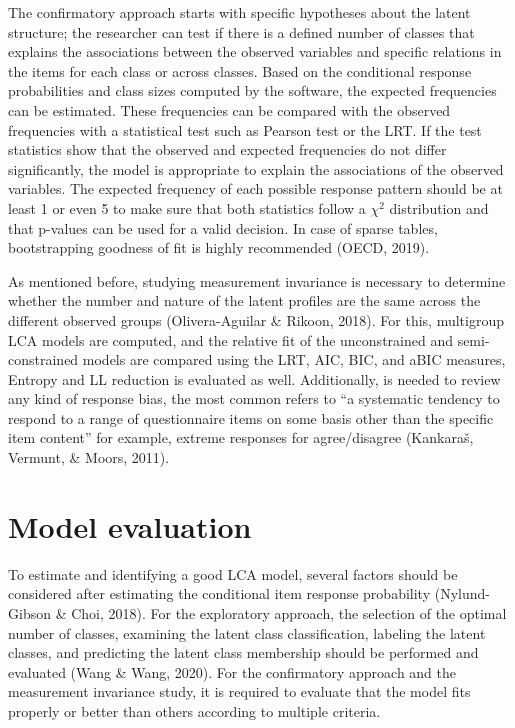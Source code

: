 \documentclass[12pt,a4paper,oneside]{reedthesis}
\begin{document}
The confirmatory approach starts with specific hypotheses about the latent structure; the researcher can test if there is a defined number of classes that explains the associations between the observed variables and specific relations in the items for each class or across classes. Based on the conditional response probabilities and class sizes computed by the software, the expected frequencies can be estimated. These frequencies can be compared with the observed frequencies with a statistical test such as Pearson test or the LRT. If the test statistics show that the observed and expected frequencies do not differ significantly, the model is appropriate to explain the associations of the observed variables. The expected frequency of each possible response pattern should be at least 1 or even 5 to make sure that both statistics follow a \(\chi^2\) distribution and that p-values can be used for a valid decision. In case of sparse tables, bootstrapping goodness of fit is highly recommended (OECD, 2019).

As mentioned before, studying measurement invariance is necessary to determine whether the number and nature of the latent profiles are the same across the different observed groups (Olivera-Aguilar \& Rikoon, 2018). For this, multigroup LCA models are computed, and the relative fit of the unconstrained and semi-constrained models are compared using the LRT, AIC, BIC, and aBIC measures, Entropy and LL reduction is evaluated as well. Additionally, is needed to review any kind of response bias, the most common refers to ``a systematic tendency to respond to a range of questionnaire items on some basis other than the specific item content'' for example, extreme responses for agree/disagree (Kankaraš, Vermunt, \& Moors, 2011).

\hypertarget{model-evaluation}{%
\section{Model evaluation}\label{model-evaluation}}

To estimate and identifying a good LCA model, several factors should be considered after estimating the conditional item response probability (Nylund-Gibson \& Choi, 2018). For the exploratory approach, the selection of the optimal number of classes, examining the latent class classification, labeling the latent classes, and predicting the latent class membership should be performed and evaluated (Wang \& Wang, 2020). For the confirmatory approach and the measurement invariance study, it is required to evaluate that the model fits properly or better than others according to multiple criteria.
\end{document}
